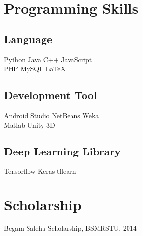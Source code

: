 \documentclass[]{deedy-resume-openfont}
\begin{document}
\begin{minipage}[t]{0.33\textwidth}




\section{Programming Skills}
\subsection{Language}
Python \textbullet{}   Java \textbullet{} C++ \textbullet{} JavaScript \\
PHP \textbullet{} MySQL \textbullet{} \LaTeX\ \\ 
\subsection{Development Tool}
Android Studio \textbullet{} NetBeans \textbullet{} Weka\\ Matlab \textbullet{} Unity 3D \\
\subsection{Deep Learning Library}
Tensorflow \textbullet{} Keras \textbullet{} tflearn
\sectionsep

\section{Scholarship}
Begam Saleha Scholarship, BSMRSTU, 2014
\sectionsep


\end{minipage}
\end{document}
